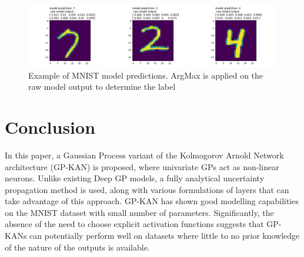 \documentclass{article}
\begin{document}
\begin{figure}[h]
    \centering
    \includegraphics[width=0.9\columnwidth]{MNIST_examples.png}
    \caption{Example of MNIST model predictions. ArgMax is applied on the raw model output to determine the label}
    \label{fig:MNIST_example}
\end{figure}

\section{Conclusion}

In this paper, a Gaussian Process variant of the Kolmogorov Arnold Network architecture (GP-KAN) is proposed, where univariate GPs act as non-linear neurons. Unlike existing Deep GP models, a fully analytical uncertainty propagation method is used, along with various formulations of layers that can take advantage of this approach. GP-KAN has shown good modelling capabilities on the MNIST dataset with small number of parameters. Significantly, the absence of the need to choose explicit activation functions suggests that GP-KANs can potentially perform well on datasets where little to no prior knowledge of the nature of the outputs is available.



\end{document}

